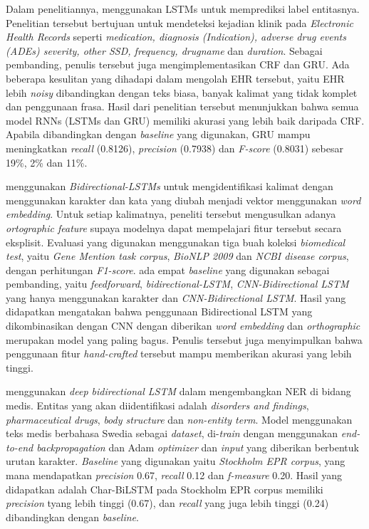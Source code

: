 Dalam penelitiannya, \cite{jagannatha2016bidirectional} menggunakan LSTMs untuk memprediksi label entitasnya. Penelitian tersebut bertujuan untuk mendeteksi kejadian klinik pada \textit{Electronic Health Records} seperti \textit{ medication, diagnosis (Indication), adverse drug events (ADEs) severity, other SSD, frequency, drugname} dan \textit{duration}. Sebagai pembanding, penulis tersebut juga mengimplementasikan CRF dan GRU. Ada beberapa kesulitan yang dihadapi dalam mengolah EHR tersebut, yaitu EHR lebih \textit{noisy} dibandingkan dengan teks biasa, banyak kalimat yang tidak komplet dan penggunaan frasa. Hasil dari penelitian tersebut menunjukkan bahwa semua model RNNs (LSTMs dan GRU) memiliki akurasi yang lebih baik daripada CRF. Apabila dibandingkan dengan \textit{baseline} yang digunakan, GRU mampu meningkatkan \textit{recall} (0.8126), \textit{precision} (0.7938) dan \textit{F-score} (0.8031) sebesar 19\%, 2\% dan 11\%.

\cite{limsopatham2016learning} menggunakan \textit{Bidirectional-LSTMs} untuk mengidentifikasi kalimat dengan menggunakan karakter dan kata yang diubah menjadi vektor menggunakan \textit{word embedding}. Untuk setiap kalimatnya, peneliti tersebut mengusulkan adanya \textit{ortographic feature} supaya modelnya dapat mempelajari fitur tersebut secara eksplisit. Evaluasi yang digunakan menggunakan tiga buah koleksi \textit{biomedical test}, yaitu \textit{Gene Mention task corpus}, \textit{BioNLP 2009} dan \textit{NCBI disease corpus}, dengan perhitungan \textit{F1-score}. ada empat \textit{baseline} yang digunakan sebagai pembanding, yaitu \textit{feedforward}, \textit{bidirectional-LSTM}, \textit{CNN-Bidirectional LSTM} yang hanya menggunakan karakter dan \textit{CNN-Bidirectional LSTM}. Hasil yang didapatkan mengatakan bahwa penggunaan Bidirectional LSTM yang dikombinasikan dengan CNN dengan diberikan \textit{word embedding} dan \textit{orthographic} merupakan model yang paling bagus. Penulis tersebut juga menyimpulkan bahwa penggunaan fitur \textit{hand-crafted} tersebut mampu memberikan akurasi yang lebih tinggi.

\cite{almgren2016named} menggunakan \textit{deep bidirectional LSTM} dalam mengembangkan NER di bidang medis. Entitas yang akan diidentifikasi adalah \textit{disorders and findings}, \textit{pharmaceutical drugs}, \textit{body structure} dan \textit{non-entity term}. Model menggunakan teks medis berbahasa Swedia sebagai \textit{dataset}, di-\textit{train} dengan menggunakan \textit{end-to-end backpropagation} dan Adam \textit{optimizer} dan \textit{input} yang diberikan berbentuk urutan karakter. \textit{Baseline} yang digunakan yaitu \textit{Stockholm EPR corpus}, yang mana mendapatkan \textit{precision} 0.67, \textit{recall} 0.12 dan \textit{f-measure} 0.20. Hasil yang didapatkan adalah Char-BiLSTM pada Stockholm EPR corpus memiliki \textit{precision} tyang lebih tinggi (0.67), dan \textit{recall} yang juga lebih tinggi (0.24) dibandingkan dengan \textit{baseline}.

